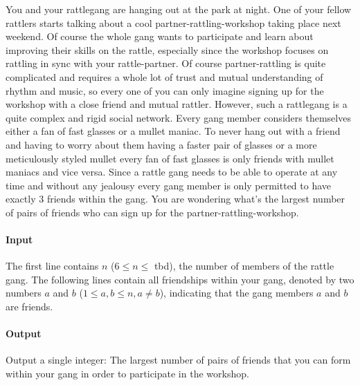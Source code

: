 



\makeheader
You and your rattlegang are hanging out at the park at night. 
One of your fellow rattlers starts talking about a cool partner-rattling-workshop taking place next weekend. Of course the whole gang wants to participate and learn about improving their skills on the rattle, especially since the workshop focuses on rattling in sync with your rattle-partner. 
Of course partner-rattling is quite complicated and requires a whole lot of trust and mutual understanding of rhythm and music, so every one of you can only imagine signing up for the workshop with a close friend and mutual rattler. 
However, such a rattlegang is a quite complex and rigid social network. Every gang member considers themselves either a fan of fast glasses or a mullet maniac. To never hang out with a friend and having to worry about them having a faster pair of glasses or a more meticulously styled mullet every fan of fast glasses is only friends with mullet maniacs and vice versa. Since a rattle gang needs to be able to operate at any time and without any jealousy every gang member is only permitted to have exactly 3 friends within the gang. You are wondering what's the largest number of pairs of friends who can sign up for the partner-rattling-workshop. 


\paragraph*{Input}
The first line contains $n$ ($6 \leq n \leq $ tbd), the number of members of the rattle gang. The following lines contain all friendships within your gang, denoted by two numbers $a$ and $b$ ($1 \leq a,b \leq n, a \neq b$), indicating that the gang members $a$ and $b$ are friends. %

\paragraph*{Output}
Output a single integer: The largest number of pairs of friends that you can form within your gang in order to participate in the workshop. 

\begin{samples}
\end{samples}

